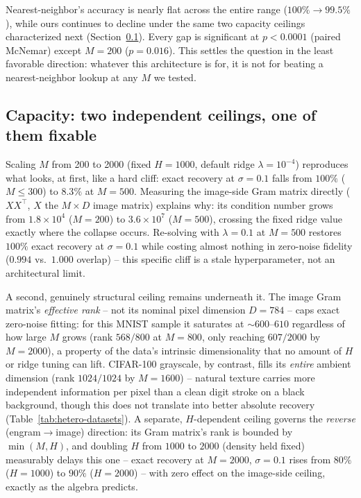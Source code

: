 \documentclass[11pt]{article}
\begin{document}
Nearest-neighbor's accuracy is nearly flat across the entire range ($100\%\to99.5\%$),
while ours continues to decline under the same two capacity ceilings characterized next
(Section~\ref{sec:capacity-hetero}). Every gap is significant at $p<0.0001$ (paired McNemar)
except $M{=}200$ ($p{=}0.016$). This settles the question in the least favorable direction:
whatever this architecture is for, it is not for beating a nearest-neighbor lookup at any $M$
we tested.

\subsection{Capacity: two independent ceilings, one of them fixable}
\label{sec:capacity-hetero}

Scaling $M$ from 200 to 2000 (fixed $H{=}1000$, default ridge $\lambda{=}10^{-4}$) reproduces
what looks, at first, like a hard cliff: exact recovery at $\sigma{=}0.1$ falls from $100\%$
($M{\leq}300$) to $8.3\%$ at $M{=}500$. Measuring the image-side Gram matrix directly
($X X^\top$, $X$ the $M{\times}D$ image matrix) explains why: its condition number grows from
$1.8{\times}10^4$ ($M{=}200$) to $3.6{\times}10^7$ ($M{=}500$), crossing the fixed ridge value
exactly where the collapse occurs. Re-solving with $\lambda{=}0.1$ at $M{=}500$ restores
$100\%$ exact recovery at $\sigma{=}0.1$ while costing almost nothing in zero-noise fidelity
($0.994$ vs.\ $1.000$ overlap) -- this specific cliff is a stale hyperparameter, not an
architectural limit.

A second, genuinely structural ceiling remains underneath it. The image Gram matrix's
\emph{effective rank} -- not its nominal pixel dimension $D{=}784$ -- caps exact zero-noise
fitting: for this MNIST sample it saturates at ${\sim}600$--$610$ regardless of how large $M$
grows (rank $568/800$ at $M{=}800$, only reaching $607/2000$ by $M{=}2000$), a property of the
data's intrinsic dimensionality that no amount of $H$ or ridge tuning can lift. CIFAR-100
grayscale, by contrast, fills its \emph{entire} ambient dimension (rank $1024/1024$ by
$M{=}1600$) -- natural texture carries more independent information per pixel than a clean
digit stroke on a black background, though this does not translate into better absolute
recovery (Table~\ref{tab:hetero-datasets}). A separate, $H$-dependent ceiling governs the
\emph{reverse} (engram$\to$image) direction: its Gram matrix's rank is bounded by
$\min(M,H)$, and doubling $H$ from $1000$ to $2000$ (density held fixed) measurably delays this
one -- exact recovery at $M{=}2000$, $\sigma{=}0.1$ rises from $80\%$ ($H{=}1000$) to $90\%$
($H{=}2000$) -- with zero effect on the image-side ceiling, exactly as the algebra predicts.
\end{document}
